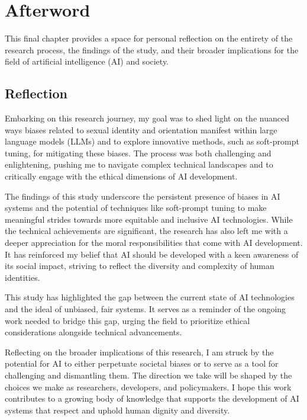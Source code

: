 \chapter{Afterword}

This final chapter provides a space for personal reflection on the entirety of the research process, the findings of the study, and their broader implications for the field of artificial intelligence (AI) and society. 

\section{Reflection}

Embarking on this research journey, my goal was to shed light on the nuanced ways biases related to sexual identity and orientation manifest within large language models (LLMs) and to explore innovative methods, such as soft-prompt tuning, for mitigating these biases. The process was both challenging and enlightening, pushing me to navigate complex technical landscapes and to critically engage with the ethical dimensions of AI development.

The findings of this study underscore the persistent presence of biases in AI systems and the potential of techniques like soft-prompt tuning to make meaningful strides towards more equitable and inclusive AI technologies. While the technical achievements are significant, the research has also left me with a deeper appreciation for the moral responsibilities that come with AI development. It has reinforced my belief that AI should be developed with a keen awareness of its social impact, striving to reflect the diversity and complexity of human identities.

This study has highlighted the gap between the current state of AI technologies and the ideal of unbiased, fair systems. It serves as a reminder of the ongoing work needed to bridge this gap, urging the field to prioritize ethical considerations alongside technical advancements.

Reflecting on the broader implications of this research, I am struck by the potential for AI to either perpetuate societal biases or to serve as a tool for challenging and dismantling them. The direction we take will be shaped by the choices we make as researchers, developers, and policymakers. I hope this work contributes to a growing body of knowledge that supports the development of AI systems that respect and uphold human dignity and diversity.

